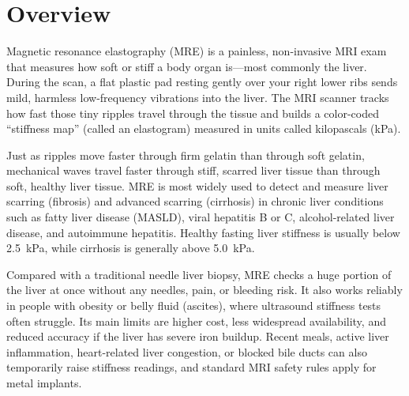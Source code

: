 \label{ch:infographic-mre}

\section{Overview}

Magnetic resonance elastography (MRE) is a painless, non-invasive MRI exam that measures how soft or stiff a body organ is---most commonly the liver. During the scan, a flat plastic pad resting gently over your right lower ribs sends mild, harmless low-frequency vibrations into the liver. The MRI scanner tracks how fast those tiny ripples travel through the tissue and builds a color-coded ``stiffness map'' (called an elastogram) measured in units called kilopascals (kPa).

Just as ripples move faster through firm gelatin than through soft gelatin, mechanical waves travel faster through stiff, scarred liver tissue than through soft, healthy liver tissue. MRE is most widely used to detect and measure liver scarring (fibrosis) and advanced scarring (cirrhosis) in chronic liver conditions such as fatty liver disease (MASLD), viral hepatitis B or C, alcohol-related liver disease, and autoimmune hepatitis. Healthy fasting liver stiffness is usually below 2.5~kPa, while cirrhosis is generally above 5.0~kPa.

Compared with a traditional needle liver biopsy, MRE checks a huge portion of the liver at once without any needles, pain, or bleeding risk. It also works reliably in people with obesity or belly fluid (ascites), where ultrasound stiffness tests often struggle. Its main limits are higher cost, less widespread availability, and reduced accuracy if the liver has severe iron buildup. Recent meals, active liver inflammation, heart-related liver congestion, or blocked bile ducts can also temporarily raise stiffness readings, and standard MRI safety rules apply for metal implants.

